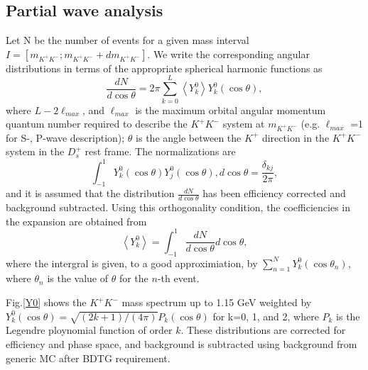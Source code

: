 \subsection{Partial wave analysis}
\par{Let N be the number of events for a given mass interval $I=[m_{K^{+}K^{-}}; m_{K^{+}K^{-}} + dm_{K^{+}K^{-}}]$. We write the corresponding angular distributions in terms of the appropriate spherical harmonic functions as
    \begin{equation}
        \frac{dN}{d\cos\theta} = 2\pi\sum_{k=0}^L\left\langle Y_{k}^{0}\right\rangle Y_{k}^{0}(\cos\theta),\label{expansion}
    \end{equation}
    where $L - 2 \ell_{max}$, and $\ell_{max}$ is the maximum orbital angular momentum quantum number required to describe the $K^{+}K^{-}$ system at $m_{K^{+}K^{-}}$ (e.g. $\ell_{max}$ =1 for S-, P-wave description); $\theta$ is the angle between the $K^{+}$ direction in the $K^{+}K^{-}$ system in the $D_{s}^{+}$ rest frame. 
    The normalizations are 
    \begin{equation}
        \int_{-1}^{1}Y_{k}^{0}(\cos\theta)Y_{j}^{0}(\cos\theta), d\cos\theta  = \frac{\delta_{kj}}{2\pi},\label{sh-normalizations}
    \end{equation}
    and it is  assumed that the distribution $\frac{dN}{d\cos\theta}$ has been efficiency corrected and background subtracted.
    Using this orthogonality condition, the coefficiencies in the expansion are obtained from 
    \begin{equation}
        \left\langle Y_{k}^{0} \right\rangle = \int_{-1}^{1} \frac{dN}{d\cos\theta} d\cos\theta,\label{expansion-coefficiencies}
    \end{equation}
    where the intergral is given, to a good approximiation, by $\sum_{n=1}^{N}Y_{k}^{0}(\cos\theta_{n})$, where $\theta_{n}$ is the value of $\theta$ for the $n$-th event.
    
    Fig.\ref{Y0} shows the $K^{+}K^{-}$ mass spectrum up to 1.15 GeV weighted by $Y_{k}^{0}(\cos\theta) = \sqrt{(2k+1)/(4\pi)}P_{k}(\cos\theta)$ for k=0, 1, and 2, where $P_{k}$ is the Legendre ploynomial function of order $k$. These distributions are corrected for efficiency and phase space, and background is subtracted using background from generic MC after BDTG requirement.
    
}
